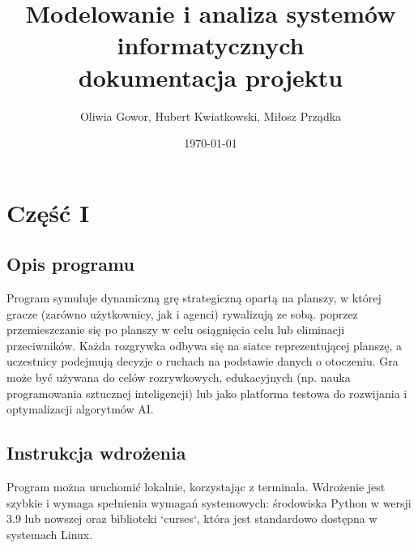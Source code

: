 \documentclass[12pt,a4paper]{article}
\begin{document}
	
	\title{Modelowanie i analiza systemów informatycznych \\\small{dokumentacja projektu}}
	\author{Oliwia Gowor, Hubert Kwiatkowski, Miłosz Prządka}
	\date{\today}

	\maketitle
	\newpage
	\section*{Część I}
	\subsection*{Opis programu}
	Program symuluje dynamiczną grę strategiczną opartą na planszy, w której gracze (zarówno użytkownicy, jak i agenci) rywalizują ze sobą. poprzez przemieszczanie się po planszy w celu osiągnięcia celu lub eliminacji przeciwników. Każda rozgrywka odbywa się na siatce reprezentującej planszę, a uczestnicy podejmują decyzje o ruchach na podstawie danych o otoczeniu. Gra może być używana do celów rozrywkowych, edukacyjnych (np. nauka programowania sztucznej inteligencji) lub jako platforma testowa do rozwijania i optymalizacji algorytmów AI.

	\subsection*{Instrukcja wdrożenia}
    Program można uruchomić lokalnie, korzystając z terminala. Wdrożenie jest szybkie i wymaga  spełnienia wymagań systemowych: środowiska Python w wersji 3.9 lub nowszej oraz biblioteki `curses`, która jest standardowo dostępna w systemach Linux.
   \break 
\end{document}
